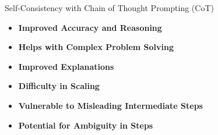 \documentclass[aspectratio=169, xcolor={dvipsnames}, 10pt, brazil]{beamer}
\begin{document}
\begin{frame}{Self-Consistency with Chain of Thought Prompting (CoT)}

    \begin{tcolorbox}[colback=green!10!white, colframe=green!70!black, title=\textbf{Merits}, fonttitle=\bfseries, coltitle=white, boxrule=0.8mm, sharp corners=southwest, enhanced, width=\textwidth-3cm, enlarge left by=1cm, drop shadow]
        \small %
        \begin{itemize}[label=\textcolor{green}{\scriptsize$\bullet$}, left=0pt, itemsep=0.2cm]
            \item \textbf{Improved Accuracy and Reasoning}
            \item \textbf{Helps with Complex Problem Solving}
            \item \textbf{Improved Explanations}
        \end{itemize}
    \end{tcolorbox}
    
    \vspace{0.4cm} %

    \begin{tcolorbox}[colback=red!10!white, colframe=red!70!black, title=\textbf{Limitations}, fonttitle=\bfseries, coltitle=white, boxrule=0.8mm, sharp corners=southwest, enhanced, width=\textwidth-3cm, enlarge left by=1cm, drop shadow]
        \small %
        \begin{itemize}[label=\textcolor{red}{\scriptsize$\bullet$}, left=0pt, itemsep=0.2cm]
            \item \textbf{Difficulty in Scaling}
            \item \textbf{Vulnerable to Misleading Intermediate Steps}
            \item \textbf{Potential for Ambiguity in Steps}
        \end{itemize}
    \end{tcolorbox}
    
\end{frame}
\end{document}
